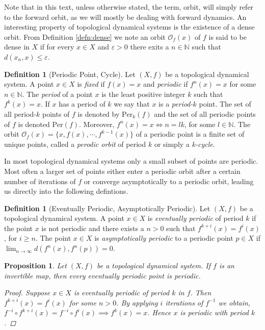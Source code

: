\documentclass[11pt,a4paper,oneside]{memoir}
\theoremstyle{plain}
\newtheorem{prop}[thm]{Proposition}
\theoremstyle{definition}
\newtheorem{defn}[thm]{Definition}
\begin{document}
Note that in this text, unless otherwise stated, the term, orbit, will simply refer to the forward orbit, as we will mostly be dealing with forward dynamics. An interesting property of topological dynamical systems is the existence of a dense orbit. From Definition \ref{defn:dense} we note an orbit $\mathcal{O}_f(x)$ of $f$ is said to be dense in $X$ if for every $x \in X$ and $\varepsilon > 0$ there exits a $n \in \mathbb{N}$ such that $d(x_n, x) \leq \varepsilon$.

\begin{defn}[Periodic Point, Cycle] \label{defn:periodic-point}
    Let $(X, f)$ be a topological dynamical system. A point $x \in X$ is \emph{fixed} if $f(x) = x$ and \emph{periodic} if $f^n(x) = x$ for some $n \in \mathbb{N}$. The \emph{period} of a point $x$ is the least positive integer $k$ such that $f^k(x) = x$. If $x$ has a period of $k$ we say that $x$ is a \emph{period-$k$} point. The set of all period-$k$ points of $f$ is denoted by $\text{Per}_k(f)$ and the set of all periodic points of $f$ is denoted $\text{Per}(f)$. Moreover, $f^n(x) = x \iff n = lk$, for some $l \in \mathbb{N}$. The orbit $\mathcal{O}_f(x) = \lbrace x, f(x), \cdots, f^{k-1}(x) \rbrace$ of a periodic point is a finite set of unique points, called a \emph{perodic orbit} of period $k$ or simply a \emph{k-cycle}.
\end{defn}

In most topological dynamical systems only a small subset of points are periodic. Most often a larger set of points either enter a periodic orbit after a certain number of iterations of $f$ or converge asymptotically to a periodic orbit, leading us directly into the following defintions.

\begin{defn}[Eventually Periodic, Asymptotically Periodic] \label{defn:eventually-asymptotically-periodic}
    Let $(X, f)$ be a topological dynamical system. A point $x \in X$ is \emph{eventually periodic} of period $k$ if the point $x$ is not periodic and there exists a $n > 0$ such that $f^{k+i}(x) = f^i(x)$, for $i \geq n$. The point $x \in X$ is \emph{asymptotically periodic} to a periodic point $p \in X$ if $\lim_{n \to \infty} d(f^n(x), f^n(p)) = 0$.
\end{defn}

\begin{prop} \label{prop:eventually-periodic-implies-periodic}
    Let $(X, f)$ be a topological dynamical system. If $f$ is an invertible map, then every eventually periodic point is periodic.
    \begin{proof}
        Suppose $x \in X$ is eventually periodic of period $k$ in $f$. Then $f^{k + i}(x) = f^i(x)$ for some $n > 0$. By applying $i$ iterations of $f^{-1}$ we obtain, $f^{-i} \circ f^{k + i}(x) = f^{-i} \circ f^{i}(x) \implies f^k(x) = x$. Hence $x$ is periodic with period $k$.
    \end{proof}
\end{prop}
\end{document}
